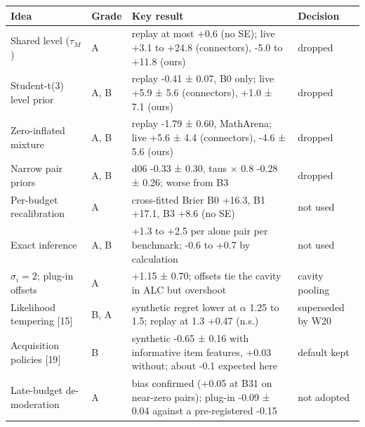 \documentclass[
]{article}
\begin{document}
\begin{longtable}[]{@{}
  >{\raggedright\arraybackslash}p{}
  >{\raggedright\arraybackslash}p{}
  >{\raggedright\arraybackslash}p{}
  >{\raggedright\arraybackslash}p{}@{}}
\toprule\noalign{}
\begin{minipage}[b]{\linewidth}\raggedright
Idea
\end{minipage} & \begin{minipage}[b]{\linewidth}\raggedright
Grade
\end{minipage} & \begin{minipage}[b]{\linewidth}\raggedright
Key result
\end{minipage} & \begin{minipage}[b]{\linewidth}\raggedright
Decision
\end{minipage} \\
\midrule\noalign{}
\endhead
\bottomrule\noalign{}
\endlastfoot
Shared level (\(\tau_M\)) & A & replay at most +0.6 (no SE); live +3.1
to +24.8 (connectors), -5.0 to +11.8 (ours) & dropped \\
Student-t(3) level prior & A, B & replay -0.41 ± 0.07, B0 only; live
+5.9 ± 5.6 (connectors), +1.0 ± 7.1 (ours) & dropped \\
Zero-inflated mixture & A, B & replay -1.79 ± 0.60, MathArena; live +5.6
± 4.4 (connectors), -4.6 ± 5.6 (ours) & dropped \\
Narrow pair priors & A, B & d06 -0.33 ± 0.30, taus × 0.8 -0.28 ± 0.26;
worse from B3 & dropped \\
Per-budget recalibration & A & cross-fitted Brier B0 +16.3, B1 +17.1, B3
+8.6 (no SE) & not used \\
Exact inference & A, B & +1.3 to +2.5 per alone pair per benchmark; -0.6
to +0.7 by calculation & not used \\
\(\sigma_i = 2\); plug-in offsets & A & +1.15 ± 0.70; offsets tie the
cavity in ALC but overshoot & cavity pooling \\
Likelihood tempering {[}15{]} & B, A & synthetic regret lower at
\(\alpha\) 1.25 to 1.5; replay at 1.3 +0.47 (n.s.) & superseded by
W20 \\
Acquisition policies {[}19{]} & B & synthetic -0.65 ± 0.16 with
informative item features, +0.03 without; about -0.1 expected here &
default kept \\
Late-budget de-moderation & A & bias confirmed (+0.05 at B31 on
near-zero pairs); plug-in -0.09 ± 0.04 against a pre-registered -0.15 &
not adopted \\
\end{longtable}
\end{document}
